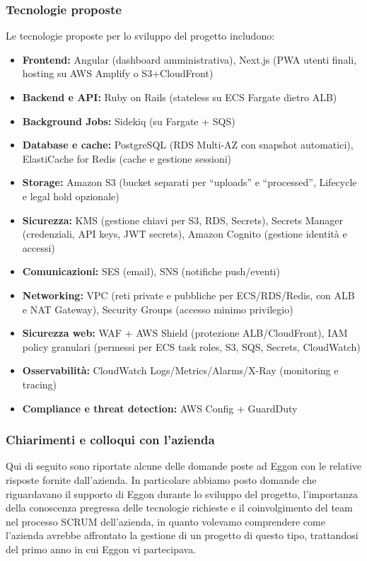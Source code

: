 \documentclass[a4paper,11pt]{article}
\begin{document}
\subsubsection{Tecnologie proposte}
Le tecnologie proposte per lo sviluppo del progetto includono:
\begin{itemize}[noitemsep, topsep=0pt]
  \item \textbf{Frontend:} Angular (dashboard amministrativa), Next.js (PWA utenti finali, hosting su AWS Amplify o S3+CloudFront)
  \item \textbf{Backend e API:} Ruby on Rails (stateless su ECS Fargate dietro ALB)
  \item \textbf{Background Jobs:} Sidekiq (su Fargate + SQS)
  \item \textbf{Database e cache:} PostgreSQL (RDS Multi-AZ con snapshot automatici), ElastiCache for Redis (cache e gestione sessioni)
  \item \textbf{Storage:} Amazon S3 (bucket separati per “uploads” e “processed”, Lifecycle e legal hold opzionale)
  \item \textbf{Sicurezza:} KMS (gestione chiavi per S3, RDS, Secrets), Secrets Manager (credenziali, API keys, JWT secrets), Amazon Cognito (gestione identità e accessi)
  \item \textbf{Comunicazioni:} SES (email), SNS (notifiche push/eventi)
  \item \textbf{Networking:} VPC (reti private e pubbliche per ECS/RDS/Redis, con ALB e NAT Gateway), Security Groups (accesso minimo privilegio)
  \item \textbf{Sicurezza web:} WAF + AWS Shield (protezione ALB/CloudFront), IAM policy granulari (permessi per ECS task roles, S3, SQS, Secrets, CloudWatch)
  \item \textbf{Osservabilità:} CloudWatch Logs/Metrics/Alarms/X-Ray (monitoring e tracing)
  \item \textbf{Compliance e threat detection:} AWS Config + GuardDuty
\end{itemize}

\subsubsection{Chiarimenti e colloqui con l'azienda}

\parbox[t]{\linewidth}{%
Qui di seguito sono riportate alcune delle domande poste ad Eggon con le relative risposte fornite dall'azienda. In particolare abbiamo posto domande che riguardavano il supporto di Eggon durante lo sviluppo del progetto, l'importanza della conoscenza pregressa delle tecnologie richieste e il coinvolgimento del team nel processo SCRUM dell'azienda, in quanto volevamo comprendere come l’azienda avrebbe affrontato la gestione di un progetto di questo tipo, trattandosi del primo anno in cui Eggon vi partecipava.
}
\end{document}

